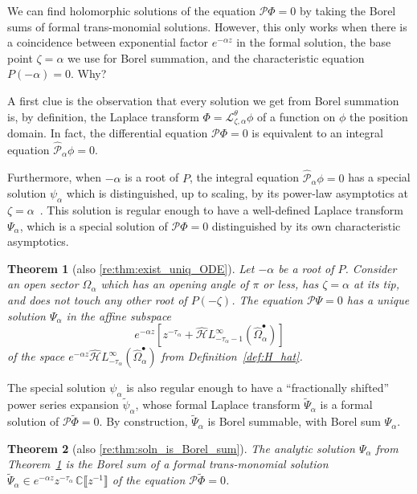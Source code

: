 \documentclass{article}
\newcommand{\dualsingexp}[1]{\widehat{\mathcal{H}}L^\infty_{#1}}
\newcommand{\C}{\mathbb{C}}
\newcommand{\series}[1]{\tilde{#1}}
\newcommand{\laplace}{\mathcal{L}}
\theoremstyle{definition}
\theoremstyle{plain}
\newtheorem{theorem}{Theorem}[section]
\begin{document}
We can find holomorphic solutions of the equation $\mathcal{P}\Phi = 0$ by taking the Borel sums of formal trans-monomial solutions. However, this only works when there is a coincidence between exponential factor $e^{-\alpha z}$ in the formal solution, the base point $\zeta = \alpha$ we use for Borel summation, and the characteristic equation $P(-\alpha) = 0$. Why?

A first clue is the observation that every solution we get from Borel summation is, by definition, the Laplace transform $\Phi = \laplace_{\zeta,\alpha}^\theta \phi$ of a function on $\phi$ the position domain. In fact, the differential equation $\mathcal{P}\Phi = 0$ is equivalent to an integral equation $\hat{\mathcal{P}}_\alpha \phi = 0$.

Furthermore, when $-\alpha$ is a root of $P$, the integral equation $\hat{\mathcal{P}}_\alpha \phi = 0$ has a special solution $\psi_\alpha$ which is distinguished, up to scaling, by its power-law asymptotics at $\zeta = \alpha$~\cite[Theorem~4]{reg-sing-volterra}. This solution is regular enough to have a well-defined Laplace transform $\Psi_\alpha$, which is a special solution of $\mathcal{P}\Phi = 0$ distinguished by its own characteristic asymptotics.
\begin{theorem}[also \ref{re:thm:exist_uniq_ODE}]\label{thm:exist_uniq_ODE}
Let $-\alpha$ be a root of $P$. Consider an open sector $\Omega_\alpha$ which has an opening angle of $\pi$ or less, has $\zeta = \alpha$ at its tip, and does not touch any other root of $P(-\zeta)$. The equation $\mathcal{P}\Psi = 0$ has a unique solution $\Psi_\alpha$ in the affine subspace
\[ e^{-\alpha z} \left[ z^{-\tau_\alpha} + \dualsingexp{-\tau_\alpha-1}(\widehat{\Omega}_\alpha^\bullet) \right] \]
of the space $e^{-\alpha z} \dualsingexp{-\tau_\alpha}(\widehat{\Omega}_\alpha^\bullet)$ from Definition~\ref{def:H_hat}.
\end{theorem}
The special solution $\psi_\alpha$ is also regular enough to have a ``fractionally shifted'' power series expansion $\series{\psi}_\alpha$, whose formal Laplace transform $\series{\Psi}_\alpha$ is a formal solution of $\mathcal{P}\series{\Phi} = 0$. By construction, $\series{\Psi}_\alpha$ is Borel summable, with Borel sum $\Psi_\alpha$.
\begin{theorem}[also \ref{re:thm:soln_is_Borel_sum}]\label{thm:soln_is_Borel_sum}
The analytic solution $\Psi_\alpha$ from Theorem~\ref{thm:exist_uniq_ODE} is the Borel sum of a formal trans-monomial solution $\series{\Psi}_\alpha \in e^{-\alpha z} z^{-\tau_\alpha}\,\C \llbracket z^{-1} \rrbracket$ of the equation $\mathcal{P}\series{\Phi} = 0$.
\end{theorem}
\end{document}
